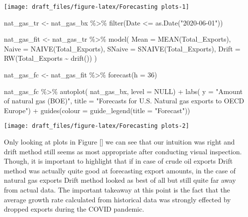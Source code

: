 \documentclass[
]{article}
\newenvironment{Shaded}{\begin{snugshade}}{\end{snugshade}}
\newcommand{\AttributeTok}[1]{\textcolor[rgb]{0.77,0.63,0.00}{#1}}
\newcommand{\ConstantTok}[1]{\textcolor[rgb]{0.00,0.00,0.00}{#1}}
\newcommand{\DecValTok}[1]{\textcolor[rgb]{0.00,0.00,0.81}{#1}}
\newcommand{\FunctionTok}[1]{\textcolor[rgb]{0.00,0.00,0.00}{#1}}
\newcommand{\NormalTok}[1]{#1}
\newcommand{\OtherTok}[1]{\textcolor[rgb]{0.56,0.35,0.01}{#1}}
\newcommand{\SpecialCharTok}[1]{\textcolor[rgb]{0.00,0.00,0.00}{#1}}
\newcommand{\StringTok}[1]{\textcolor[rgb]{0.31,0.60,0.02}{#1}}
\begin{document}
\begin{center}\texttt{[image: draft\_files/figure-latex/Forecasting plots-1]} \end{center}

\begin{Shaded}
\begin{Highlighting}[]
\NormalTok{nat\_gas\_tr }\OtherTok{\textless{}{-}}\NormalTok{ nat\_gas\_bx }\SpecialCharTok{\%\textgreater{}\%} 
  \FunctionTok{filter}\NormalTok{(Date }\SpecialCharTok{\textless{}=} \FunctionTok{as.Date}\NormalTok{(}\StringTok{"2020{-}06{-}01"}\NormalTok{))}


\NormalTok{nat\_gas\_fit }\OtherTok{\textless{}{-}}\NormalTok{ nat\_gas\_tr }\SpecialCharTok{\%\textgreater{}\%} 
  \FunctionTok{model}\NormalTok{(}
    \AttributeTok{Mean =} \FunctionTok{MEAN}\NormalTok{(Total\_Exports),}
    \AttributeTok{Naive =} \FunctionTok{NAIVE}\NormalTok{(Total\_Exports),}
    \AttributeTok{SNaive =} \FunctionTok{SNAIVE}\NormalTok{(Total\_Exports),}
    \AttributeTok{Drift =} \FunctionTok{RW}\NormalTok{(Total\_Exports }\SpecialCharTok{\textasciitilde{}} \FunctionTok{drift}\NormalTok{())}
\NormalTok{  )}

\NormalTok{nat\_gas\_fc }\OtherTok{\textless{}{-}}\NormalTok{ nat\_gas\_fit }\SpecialCharTok{\%\textgreater{}\%} 
  \FunctionTok{forecast}\NormalTok{(}\AttributeTok{h =} \DecValTok{36}\NormalTok{)}

\NormalTok{nat\_gas\_fc }\SpecialCharTok{\%\textgreater{}\%} 
  \FunctionTok{autoplot}\NormalTok{(}
\NormalTok{    nat\_gas\_bx,}
    \AttributeTok{level =} \ConstantTok{NULL}\NormalTok{) }\SpecialCharTok{+}
  \FunctionTok{labs}\NormalTok{(}
    \AttributeTok{y =} \StringTok{"Amount of natural gas (BOE)"}\NormalTok{,}
    \AttributeTok{title =} \StringTok{"Forecasts for U.S. Natural gas exports to OECD Europe"}\NormalTok{) }\SpecialCharTok{+}
  \FunctionTok{guides}\NormalTok{(}\AttributeTok{colour =} \FunctionTok{guide\_legend}\NormalTok{(}\AttributeTok{title =} \StringTok{"Forecast"}\NormalTok{))}
\end{Highlighting}
\end{Shaded}

\begin{center}\texttt{[image: draft\_files/figure-latex/Forecasting plots-2]} \end{center}

Only looking at plots in Figure {[}{]} we can see that our intuition was
right and drift method still seems as most appropriate after conducting
visual inspection. Though, it is important to highlight that if in case
of crude oil exports Drift method was actually quite good at forecasting
export amounts, in the case of natural gas exports Drift method looked
as best of all but still quite far away from actual data. The important
takeaway at this point is the fact that the average growth rate
calculated from historical data was strongly effected by dropped exports
during the COVID pandemic.
\end{document}
